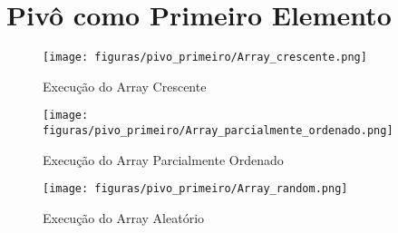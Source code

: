 \section{\esp Pivô como Primeiro Elemento}

\begin{table}[H]
    \centering
    \scriptsize
    \caption{Comparação dos cenários com pivô sendo o primeiro elemento, considerando $n=1000$.}
    \label{tab:pivo_primeiro}
    
\end{table}

\begin{figure}[H]
    \centering
    \caption{Execução do Array Crescente}
    \texttt{[image: figuras/pivo\_primeiro/Array\_crescente.png]}
    \label{fig:pivo_primeiro_crescente}
\end{figure}

\begin{figure}[H]
    \centering
    \caption{Execução do Array Parcialmente Ordenado}
    \texttt{[image: figuras/pivo\_primeiro/Array\_parcialmente\_ordenado.png]}
    \label{fig:pivo_primeiro_parcialmente}
\end{figure}

\begin{figure}[H]
    \centering
    \caption{Execução do Array Aleatório}
    \texttt{[image: figuras/pivo\_primeiro/Array\_random.png]}
    \label{fig:pivo_primeiro_random}
\end{figure}

